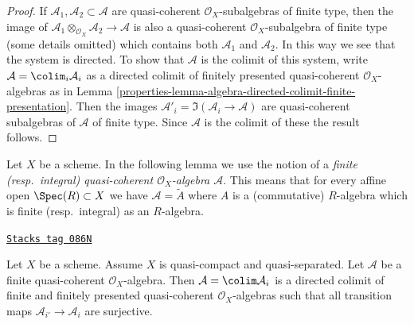 \begin{proof}

If $\mathcal{A}_1, \mathcal{A}_2 \subset \mathcal{A}$ are
quasi-coherent $\mathcal{O}_X$-subalgebras of finite type, then the image of
$\mathcal{A}_1 \otimes_{\mathcal{O}_X} \mathcal{A}_2 \to \mathcal{A}$
is also a quasi-coherent $\mathcal{O}_X$-subalgebra of finite type
(some details omitted) which contains both $\mathcal{A}_1$ and $\mathcal{A}_2$.
In this way we see that the system is directed.
To show that $\mathcal{A}$ is the colimit of this system, write
$\mathcal{A} = \colim_i \mathcal{A}_i$ as a directed
colimit of finitely presented quasi-coherent $\mathcal{O}_X$-algebras as in
Lemma \ref{properties-lemma-algebra-directed-colimit-finite-presentation}.
Then the images $\mathcal{A}'_i = \Im(\mathcal{A}_i \to \mathcal{A})$ are
quasi-coherent subalgebras of $\mathcal{A}$ of finite type. Since
$\mathcal{A}$ is the colimit of these the result follows.
\end{proof}

Let $X$ be a scheme. In the following lemma we use the notion
of a {\it finite (resp.\ integral) quasi-coherent
$\mathcal{O}_X$-algebra $\mathcal{A}$}. This means that for every
affine open $\Spec(R) \subset X$ we have
$\mathcal{A} = \widetilde{A}$ where $A$ is a (commutative) $R$-algebra
which is finite (resp.\ integral) as an $R$-algebra.

\begin{lemma}
\label{properties-lemma-finite-algebra-directed-colimit-finite-finitely-presented}
\href{https://stacks.math.columbia.edu/tag/086N}{\texttt{Stacks tag 086N}}

Let $X$ be a scheme. Assume $X$ is quasi-compact and quasi-separated.
Let $\mathcal{A}$ be a finite quasi-coherent $\mathcal{O}_X$-algebra.
Then $\mathcal{A} = \colim \mathcal{A}_i$ is a directed colimit of finite
and finitely presented quasi-coherent $\mathcal{O}_X$-algebras
such that all transition maps $\mathcal{A}_{i'} \to \mathcal{A}_i$
are surjective.
\end{lemma}

